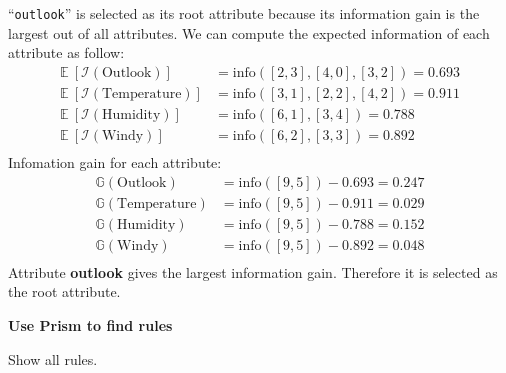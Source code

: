 \documentclass[12pt,twoside]{article}
\begin{document}
\begin{exercises}
\begin{exerciseparts}
\ifsolution \solution{}
``\texttt{outlook}'' is selected as its root attribute because its
information gain is the largest out of all attributes. We can compute
the expected information of each attribute as follow:
\begin{equation*}
  \begin{aligned}
    \mathds{E} \ [\mathcal{I} (\mbox{Outlook})] & = \mbox{info}([2,3],[4,0],[3,2]) = 0.693 \\
    \mathds{E} \ [\mathcal{I} (\mbox{Temperature})] & = \mbox{info}([3,1],[2,2],[4,2]) = 0.911 \\
    \mathds{E} \ [\mathcal{I} (\mbox{Humidity})] & = \mbox{info}([6,1],[3,4]) = 0.788 \\
    \mathds{E} \ [\mathcal{I} (\mbox{Windy})] & = \mbox{info}([6,2],[3,3]) = 0.892 \\
  \end{aligned}
\end{equation*}
Infomation gain for each attribute: 
\begin{equation*}
  \begin{aligned}
    \mathds{G} (\mbox{Outlook}) & = \mbox{info}([9,5]) - 0.693 = 0.247 \\
    \mathds{G} (\mbox{Temperature}) & = \mbox{info}([9,5]) - 0.911 = 0.029 \\
    \mathds{G} (\mbox{Humidity}) & = \mbox{info}([9,5]) - 0.788 = 0.152 \\
    \mathds{G} (\mbox{Windy}) & = \mbox{info}([9,5]) - 0.892 = 0.048 \\
  \end{aligned}
\end{equation*}
Attribute \textbf{outlook} gives the largest information gain. 
Therefore it is selected as the root attribute.
\fi

\end{exerciseparts}

\problem \textbf{Use Prism to find rules}

\begin{exerciseparts}

\exercisepart
Show all rules.


\end{exerciseparts}
\end{exercises}
\end{document}
